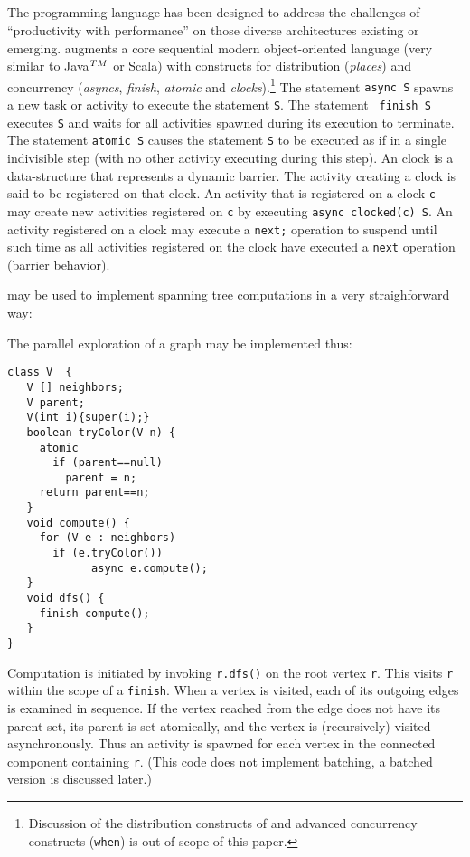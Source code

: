 \subsection{\Xten{}}
The \Xten{} programming language \cite{x10} has been designed to
address the challenges of ``productivity with performance'' on those
diverse architectures existing or emerging.  \Xten{} augments a core
sequential modern object-oriented language (very similar to Java$^{\sc
TM}$ or Scala) with constructs for distribution ({\em places}) and
concurrency ({\em asyncs}, {\em finish}, {\em atomic} and {\em
clocks}).\footnote{Discussion of the distribution constructs of
\Xten{} and advanced concurrency constructs ({\tt when}) is out of
scope of this paper.}  The statement {\tt async S} spawns a new task
or activity to execute the statement {\tt S}. The statement {\tt
finish S} executes {\tt S} and waits for all activities spawned during
its execution to terminate. The statement {\tt atomic S} causes the
statement {\tt S} to be executed as if in a single indivisible step
(with no other activity executing during this step). An \Xten{} clock
is a data-structure that represents a dynamic barrier. The activity
creating a clock is said to be registered on that clock. An activity
that is registered on a clock {\tt c} may create new activities
registered on {\tt c} by executing {\tt async clocked(c) S}. An
activity registered on a clock may execute a {\tt next;} operation to
suspend until such time as all activities registered on the clock have
executed a {\tt next} operation (barrier behavior).

\Xten{} may be used to implement spanning tree computations in a very straighforward way:
\begin{example} \label{example:dfs}
The parallel exploration of a graph may be implemented thus:
{\footnotesize
\begin{verbatim}
class V  {
   V [] neighbors;
   V parent;
   V(int i){super(i);}
   boolean tryColor(V n) {
     atomic 
       if (parent==null) 
         parent = n;
     return parent==n;
   }
   void compute() {
     for (V e : neighbors) 
       if (e.tryColor()) 
             async e.compute();
   }
   void dfs() {
     finish compute();
   }
}
\end{verbatim}}
Computation is initiated by invoking {\tt r.dfs()} on 
the root vertex {\tt r}. This visits {\tt r} within the
scope of a {\tt finish}. When a vertex is visited, each of its
outgoing edges is examined in sequence. If the vertex reached from
the edge does not have its parent set, its parent is set atomically, 
and the vertex is (recursively) visited asynchronously. Thus an
activity is spawned for each vertex in the connected component
containing {\tt r}. (This code does not implement
batching, a batched version is discussed later.)
\end{example}

